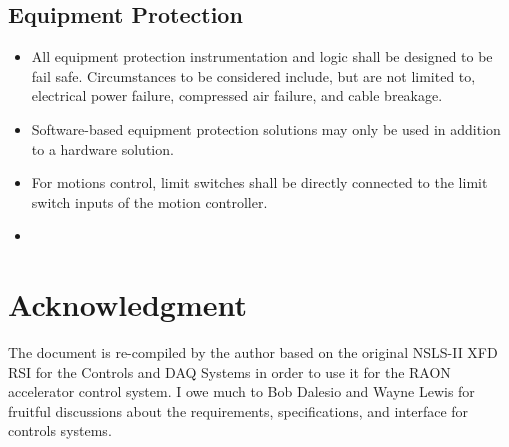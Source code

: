 \documentclass[11pt
  , a4paper
  , article
  , oneside
]{memoir}
\begin{document}
\section{Equipment Protection}
\begin{itemize}
  \item All equipment protection instrumentation and logic shall be designed to be fail safe. Circumstances to be considered include, but are not limited to, electrical power failure, compressed air failure, and cable breakage. 
  \item Software-based equipment protection solutions may only be used in addition to a hardware solution.
  \item For motions control, limit switches shall be directly connected to the limit switch inputs of the motion controller.
  \item 
\end{itemize}


\chapter{Acknowledgment}
The document is re-compiled by the author based on the original NSLS-II XFD RSI for the Controls and DAQ Systems \cite{LT-C-XFD-RSI-CO-001} in order to use it for the RAON accelerator control system. I owe much to Bob Dalesio and Wayne Lewis for fruitful discussions about the requirements, specifications, and interface for controls systems.


\printglossaries


\clearpage
%
%
%

%

\end{document}
